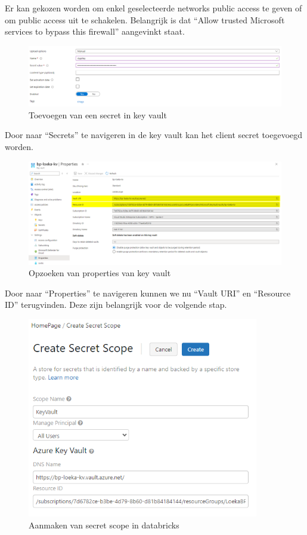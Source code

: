 Er kan gekozen worden om enkel geselecteerde networks public access te geven of om public access uit te schakelen. Belangrijk is dat ``Allow trusted Microsoft services to bypass this firewall'' aangevinkt staat.

\begin{figure}[H]
    \centering
    \includegraphics[width=1\textwidth]{./graphics/databricks/connection_12.png}
    \caption{Toevoegen van een secret in key vault}
\end{figure}

Door naar ``Secrets'' te navigeren in de key vault kan het client secret toegevoegd worden.

\begin{figure}[H]
    \centering
    \includegraphics[width=1\textwidth]{./graphics/databricks/connection_13.png}
    \caption{Opzoeken van properties van key vault}
\end{figure}

Door naar ``Properties'' te navigeren kunnen we nu ``Vault URI'' en ``Resource ID'' terugvinden. Deze zijn belangrijk voor de volgende stap.

\begin{figure}[H]
    \centering
    \includegraphics[width=0.9\textwidth]{./graphics/databricks/connection_14.png}
    \caption{Aanmaken van secret scope in databricks}
\end{figure}


